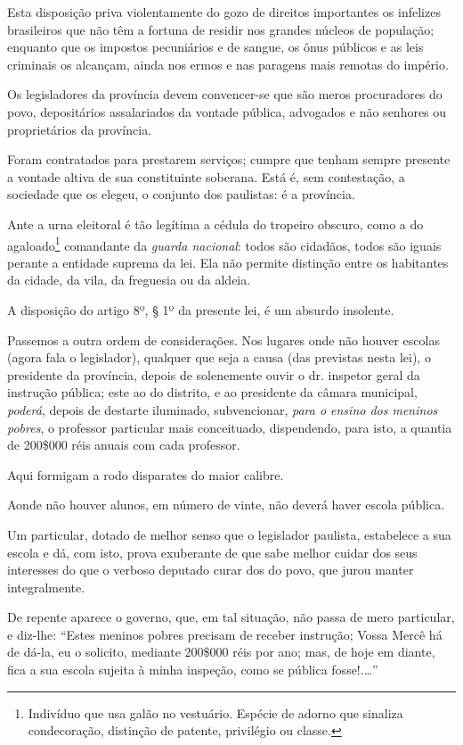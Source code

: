 Esta disposição priva violentamente do gozo de direitos importantes os
infelizes brasileiros que não têm a fortuna de residir nos grandes
núcleos de população; enquanto que os impostos pecuniários e de sangue,
os ônus públicos e as leis criminais os alcançam, ainda nos ermos e nas
paragens mais remotas do império.

Os legisladores da província devem convencer-se que são meros
procuradores do povo, depositários assalariados da vontade pública,
advogados e não senhores ou proprietários da província.

Foram contratados para prestarem serviços; cumpre que tenham sempre
presente a vontade altiva de sua constituinte soberana. Está é, sem
contestação, a sociedade que os elegeu, o conjunto dos paulistas: é a
província.

Ante a urna eleitoral é tão legítima a cédula do tropeiro obscuro, como
a do agaloado\footnote{Indivíduo que usa galão no vestuário. Espécie
  de adorno que sinaliza condecoração, distinção de patente, privilégio
  ou classe.} comandante da \emph{guarda nacional}: todos são cidadãos,
todos são iguais perante a entidade suprema da lei. Ela não permite
distinção entre os habitantes da cidade, da vila, da freguesia ou da
aldeia.

A disposição do artigo 8º, § 1º da presente lei, é um absurdo insolente.

Passemos a outra ordem de considerações. Nos lugares onde não houver
escolas (agora fala o legislador), qualquer que seja a causa (das
previstas nesta lei), o presidente da província, depois de solenemente
ouvir o dr. inspetor geral da instrução pública; este ao do distrito, e
ao presidente da câmara municipal, \emph{poderá}, depois de destarte
iluminado, subvencionar, \emph{para o ensino dos meninos pobres}, o
professor particular mais conceituado, dispendendo, para isto, a quantia
de 200\$000 réis anuais com cada professor.

Aqui formigam a rodo disparates do maior calibre.

Aonde não houver alunos, em número de vinte, não deverá haver escola
pública.

Um particular, dotado de melhor senso que o legislador paulista,
estabelece a sua escola e dá, com isto, prova exuberante de que sabe
melhor cuidar dos seus interesses do que o verboso deputado curar dos do
povo, que jurou manter integralmente.

De repente aparece o governo, que, em tal situação, não passa de mero
particular, e diz-lhe: ``Estes meninos pobres precisam de receber
instrução; Vossa Mercê há de dá-la, eu o solicito, mediante 200\$000
réis por ano; mas, de hoje em diante, fica a sua escola sujeita à minha
inspeção, como se pública fosse!.\ldots''

